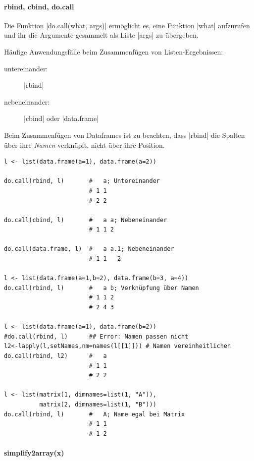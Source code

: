 \documentclass[10pt,twocolumn]{scrartcl}
\renewcommand{\lstinline}{\mycoloredinline}
\begin{document}
\paragraph{rbind, cbind, do.call}

Die Funktion \lstinline|do.call(what, args)| ermöglicht es, eine Funktion \lstinline|what| aufzurufen und ihr die Argumente gesammelt als Liste \lstinline|args| zu übergeben.

Häufige Anwendungsfälle beim Zusammenfügen von Listen-Ergebnissen:

\begin{description}
    \item[untereinander:] \lstinline|rbind|
    \item[nebeneinander:] \lstinline|cbind| oder \lstinline|data.frame|
\end{description}

Beim Zusammenfügen von Dataframes ist zu beachten, dass \lstinline|rbind| die Spalten über ihre \emph{Namen} verknüpft, nicht über ihre Position.

\begin{lstlisting}
l <- list(data.frame(a=1), data.frame(a=2))

do.call(rbind, l)       #   a; Untereinander
                        # 1 1
                        # 2 2

do.call(cbind, l)       #   a a; Nebeneinander
                        # 1 1 2

do.call(data.frame, l)  #   a a.1; Nebeneinander
                        # 1 1   2

l <- list(data.frame(a=1,b=2), data.frame(b=3, a=4))
do.call(rbind, l)       #   a b; Verknüpfung über Namen
                        # 1 1 2
                        # 2 4 3

l <- list(data.frame(a=1), data.frame(b=2))
#do.call(rbind, l)      ## Error: Namen passen nicht
l2<-lapply(l,setNames,nm=names(l[[1]])) # Namen vereinheitlichen
do.call(rbind, l2)      #   a
                        # 1 1
                        # 2 2

l <- list(matrix(1, dimnames=list(1, "A")), 
          matrix(2, dimnames=list(1, "B")))
do.call(rbind, l)       #   A; Name egal bei Matrix
                        # 1 1
                        # 1 2
\end{lstlisting}


\paragraph{simplify2array(x)}
\end{document}
